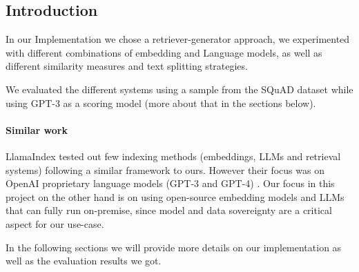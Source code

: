 \documentclass[a4paper,12pt]{article}
\begin{document}
\subsection{Introduction}
In our Implementation we chose a retriever-generator approach, we experimented with different combinations of embedding and Language models, as well as different similarity measures and text splitting strategies.

We evaluated the different systems using a sample from the SQuAD \cite{squad} dataset while using GPT-3 \cite{gpt3} as a scoring model (more about that in the sections below).  

\paragraph*{Similar work} LlamaIndex \cite{llamaindex} tested out few indexing methods (embeddings, LLMs and retrieval systems) following a similar framework to ours. 
However their focus was on OpenAI proprietary language models (GPT-3 and GPT-4) \cite{gpt3, gpt4}. Our focus in this project 
on the other hand is on using open-source embedding models and LLMs that can fully run on-premise, since model and data sovereignty are a critical aspect for our use-case.

In the following sections we will provide more details on our implementation as well as the evaluation results we got.
\end{document}
